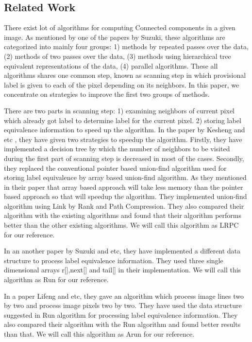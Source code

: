 \subsection{Related Work}
\label{sec:relatedworks}

There exist lot of algorithms for computing Connected components in a given image.
As mentioned by one of the papers by Suzuki, these algorithms are categorized into mainly four groups:
1) methods by repeated passes over the data, (2) methods of two passes over the data,
(3) methods using hierarchical tree equivalent representations of the data, (4) parallel algorithms.
These all algorithms shares one common step, known as scanning step in which provisional label is given
to each of the pixel depending on its neighbors. In this paper, we concentrate on strategies to improve
the first two groups of methods.

There are two parts in scanning step: 1) examining neighbors of current pixel which already got label to
determine label for the current pixel. 2) storing label equivalence information to speed up the algorithm.
In the paper by Kesheng and etc , they have given two strategies to speedup the algorithm.
Firstly, they have implemented a decision tree by which the number of neighbors to be visited during the
first part of scanning step is  decreased in most of the cases. Secondly, they replaced the conventional
pointer based union-find algorithm used for storing label equivalence by array based union-find algorithm.
As they mentioned in their paper that array based approach will take less memory than the pointer based
approach so that will speedup the algorithm. They implemented union-find algorithm using
Link by Rank and Path Compression. They also compared their algorithm with the existing algorithms and
found that their algorithm performs better than the other existing algorithms.
We will call this algorithm as LRPC for our reference.

In an another paper by Suzuki and etc, they have implemented a different data structure to process label equivalence information.
They used three single dimensional arrays r[],next[] and tail[] in their implementation.
We will call this algorithm as Run for our reference.

In a paper Lifeng and etc, they gave an algorithm which process image lines two by two and process image pixels two by two.
They have used the data structure suggested in Run algorithm for processing label equivalence information.
They also compared their algorithm with the Run algorithm and found better results than that.
We will call this algorithm as Arun for our reference.


